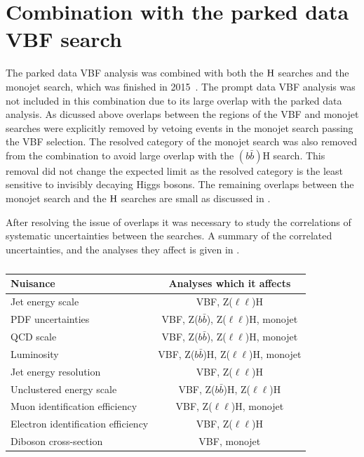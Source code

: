 \section{Combination with the parked data VBF search}
\label{sec:combparked}
The parked data \ac{VBF} analysis was combined with both the \PZ$\rm{H}$ searches and the monojet search, which was finished in 2015~\cite{CMS-PAS-HIG-15-012}. The prompt data \ac{VBF} analysis was not included in this combination due to its large overlap with the parked data analysis. As dicussed above overlaps between the regions of the \ac{VBF} and monojet searches were explicitly removed by vetoing events in the monojet search passing the \ac{VBF} selection. The resolved category of the monojet search was also removed from the combination to avoid large overlap with the \PZ$(b\bar{b})$H search. This removal did not change the expected limit as the resolved category is the least sensitive to invisibly decaying Higgs bosons. The remaining overlaps between the monojet search and the \PZ$\rm{H}$ searches are small as discussed in .

After resolving the issue of overlaps it was necessary to study the correlations of systematic uncertainties between the searches. A summary of the correlated uncertainties, and the analyses they affect is given in . 

\begin{table}
  \caption{}%
  \label{tab:parkedcorrs}
  \begin{tabular}{|l|c|}
      \hline
      Nuisance & Analyses which it affects \\
      \hline
      Jet energy scale & VBF, Z($\ell\ell$)H \\
      PDF uncertainties & VBF, Z($b\bar{b}$), Z($\ell\ell$)H, monojet \\
      QCD scale & VBF, Z($b\bar{b}$), Z($\ell\ell$)H, monojet \\
      Luminosity & VBF, Z($b\bar{b}$)H, Z($\ell\ell$)H, monojet \\
      Jet energy resolution & VBF, Z($\ell\ell$)H \\
      Unclustered energy scale & VBF, Z($b\bar{b}$)H, Z($\ell\ell$)H \\
      Muon identification efficiency & VBF, Z($\ell\ell$)H, monojet \\
      Electron identification efficiency & VBF, Z($\ell\ell$)H \\
      Diboson cross-section & VBF, monojet \\
      \hline
    \end{tabular}
\end{table}


